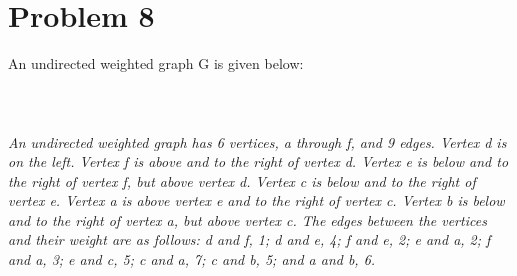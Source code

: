 \section*{Problem 8}
An undirected weighted graph G is given below:\\\\
\\\\
{\color{blue}{\bf Figure 16:} \emph{An undirected weighted graph has 6 vertices, a through f, and 9 edges. Vertex d is on the left. Vertex f is above and to the right of vertex d. Vertex e is below and to the right of vertex f, but above vertex d. Vertex c is below and to the right of vertex e. Vertex a is above vertex e and to the right of vertex c. Vertex b is below and to the right of vertex a, but above vertex c. The edges between the vertices and their weight are as follows: d and f, 1; d and e, 4; f and e, 2; e and a, 2; f and a, 3; e and c, 5; c and a, 7; c and b, 5; and a and b, 6.
\\
}
}
\\
\\
